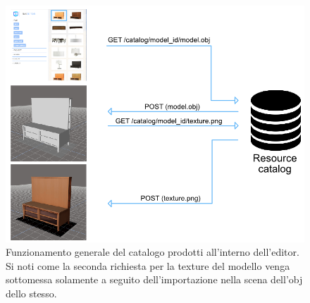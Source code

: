 \begin{figure}[h]
 \centering
 \includegraphics[width=0.7\linewidth]{images/chapter_creazione_scena/editor_2.png}\hfill
 \caption[Catalogo prodotti]{Funzionamento generale del catalogo prodotti all'interno dell'editor. Si noti come la seconda richiesta per la texture del modello venga sottomessa solamente a seguito dell'importazione nella scena dell'obj dello stesso.}
 \label{fig:editor_2}
\end{figure}

